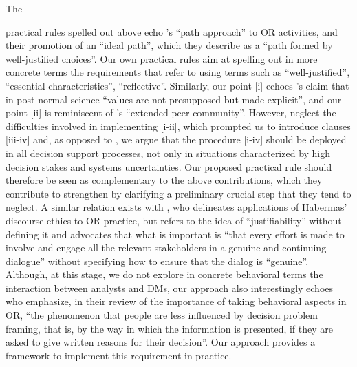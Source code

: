 \documentclass[preprint, french, english, 11pt, authoryear]{elsarticle}%
\newcommand{\ac}[1]{#1}
\newcommand{\acp}[1]{#1s}
\begin{document}
The \begin{changebar}practical rules spelled out above echo \citet{lahtinen_why_2017}'s ``path approach'' to \ac{OR} activities, and their promotion of an ``ideal path'', which they describe as a ``path formed by well-justified choices''.
Our own practical rules aim at spelling out in more concrete terms the requirements that \citet{lahtinen_why_2017} refer to using terms such as ``well-justified'', ``essential characteristics'', ``reflective''.
Similarly, our point [i] echoes \citet{funtowicz_science_1993}'s claim that in post-normal science ``values are not presupposed but made explicit'', and our point [ii] is reminiscent of \citet{funtowicz_science_1993}'s ``extended peer community''.
However, \citet{funtowicz_science_1993} neglect the difficulties involved in implementing [i-ii], which prompted us to introduce clauses [iii-iv] and, as opposed to \citet{funtowicz_science_1993}, we argue that the procedure [i-iv] should be deployed in all decision support processes, 
not only in situations characterized by high decision stakes and systems uncertainties.
Our proposed practical rule should therefore be seen as complementary to the above contributions, which they contribute to strengthen by clarifying a preliminary crucial step that they tend to neglect.
A similar relation exists with \citet{mingers_ethics_2011}, who delineates applications of Habermas' discourse ethics to \ac{OR} practice, but refers to the idea of ``justifiability'' without defining it and 
advocates that what is important is ``that every effort is made to involve and engage all the relevant stakeholders in a genuine and continuing dialogue'' without specifying how to ensure that the dialog is ``genuine''.
Although, at this stage, we do not explore in concrete behavioral terms the interaction between analysts and \acp{DM}, 
our approach also interestingly echoes \citet{hamalainen_importance_2013} who emphasize, in their review of the importance of taking behavioral aspects in \ac{OR}, 
``the phenomenon that people are less influenced by decision problem framing, that is, by the way in which the information is presented, if they are asked to give written reasons for their decision''.
Our approach provides a framework to implement this requirement in practice.\end{changebar}
\end{document}
